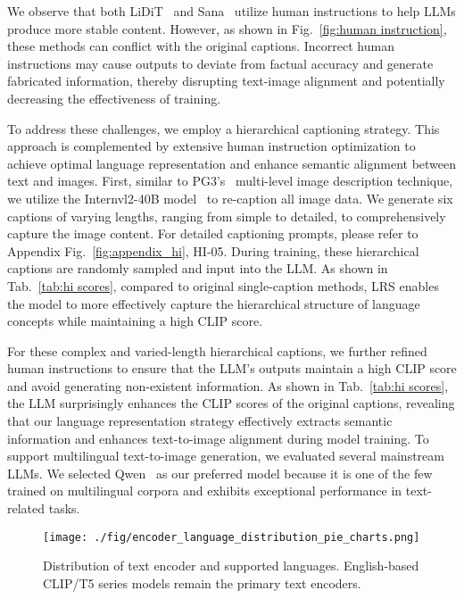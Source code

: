 We observe that both LiDiT~\cite{ma2024exploring} and Sana~\cite{xie2024sana} utilize human instructions to help LLMs produce more stable content. However, as shown in Fig.~\ref{fig:human instruction}, these methods can conflict with the original captions. Incorrect human instructions may cause outputs to deviate from factual accuracy and generate fabricated information, thereby disrupting text-image alignment and potentially decreasing the effectiveness of training.

To address these challenges, we employ a hierarchical captioning strategy. This approach is complemented by extensive human instruction optimization to achieve optimal language representation and enhance semantic alignment between text and images. First, similar to PG3's~\cite{liu2024playground} multi-level image description technique, we utilize the Internvl2-40B model~\cite{chen2024far,chen2024expanding} to re-caption all image data. We generate six captions of varying lengths, ranging from simple to detailed, to comprehensively capture the image content. For detailed captioning prompts, please refer to Appendix Fig.~\ref{fig:appendix_hi}, HI-05. During training, these hierarchical captions are randomly sampled and input into the LLM. As shown in Tab.~\ref{tab:hi scores}, compared to original single-caption methods, LRS enables the model to more effectively capture the hierarchical structure of language concepts while maintaining a high CLIP score.

For these complex and varied-length hierarchical captions, we further refined human instructions to ensure that the LLM's outputs maintain a high CLIP score and avoid generating non-existent information. As shown in Tab.~\ref{tab:hi scores}, the LLM surprisingly enhances the CLIP scores of the original captions, revealing that our language representation strategy effectively extracts semantic information and enhances text-to-image alignment during model training. To support multilingual text-to-image generation, we evaluated several mainstream LLMs. We selected Qwen~\cite{yang2024qwen2} as our preferred model because it is one of the few trained on multilingual corpora and exhibits exceptional performance in text-related tasks.







\begin{figure}[t]
  \centering
  \texttt{[image: ./fig/encoder\_language\_distribution\_pie\_charts.png]}

  \caption{Distribution of text encoder and supported languages. English-based CLIP/T5 series models remain the primary text encoders.
  }
    \vspace{-0.5em}

  \label{fig:text_encoder}
  
\end{figure}

